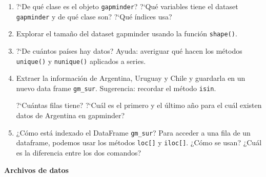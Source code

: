 \documentclass[a4paper,11pt]{article}
\theoremstyle{definition}
\begin{document}
\begin{enumerate}[resume]
\item ?`De qué clase es el objeto \lstinline{gapminder}? ?`Qu\'e variables tiene el dataset \lstinline{gapminder} y de qu\'e clase son? ?`Qu\'e \'indices usa?

\item Explorar el tama\~no del dataset gapminder usando la función \lstinline{shape()}.

\item ?`De cu\'antos pa\'ises hay datos? Ayuda: averiguar qu\'e hacen los métodos \lstinline{unique()} y \lstinline{nunique()} aplicados a series.



\item Extraer la informaci\'on de Argentina, Uruguay y Chile y guardarla en un nuevo data frame \lstinline{gm_sur}. Sugerencia: recordar el método \lstinline{isin}.

?`Cu\'antas filas tiene? ?`Cu\'al es el primero y el \'ultimo a\~no para el cu\'al existen datos de Argentina en gapminder?

\item ¿Cómo está indexado el DataFrame \lstinline{gm_sur}? Para acceder a una fila de un dataframe, podemos usar los métodos \lstinline{loc[]} y \lstinline{iloc[]}. ¿Cómo se usan? ¿Cuál es la diferencia entre los dos comandos?


\end{enumerate}

\textbf{\large Archivos de datos}
\end{document}
